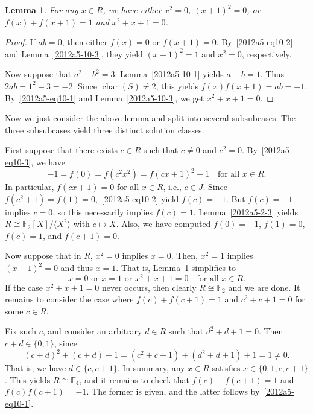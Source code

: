\documentclass{article}
\newcommand{\F}{\mathbb{F}}
\DeclareMathOperator{\rchar}{char}
\newtheorem{lemma}{Lemma}
\begin{document}
\begin{lemma}\label{2012a5-10-4}
For any $x \in R$, we have either $x^2 = 0$, $(x + 1)^2 = 0$, or $f(x) + f(x + 1) = 1$ and $x^2 + x + 1 = 0$.
\end{lemma}
\begin{proof}

If $ab = 0$, then either $f(x) = 0$ or $f(x + 1) = 0$.
By~\eqref{2012a5-eq10-2} and Lemma~\ref{2012a5-10-3}, they yield $(x + 1)^2 = 1$ and $x^2 = 0$, respectively.

Now suppose that $a^2 + b^2 = 3$.
Lemma~\ref{2012a5-10-1} yields $a + b = 1$.
Thus $2ab = 1^2 - 3 = -2$.
Since $\rchar(S) \neq 2$, this yields $f(x) f(x + 1) = ab = -1$.
By~\eqref{2012a5-eq10-1} and Lemma~\ref{2012a5-10-3}, we get $x^2 + x + 1 = 0$.
\end{proof}

Now we just consider the above lemma and split into several subsubcases.
The three subsubcases yield three distinct solution classes.

First suppose that there exists $c \in R$ such that $c \neq 0$ and $c^2 = 0$.
By~\eqref{2012a5-eq10-3}, we have
\[ -1 = f(0) = f(c^2 x^2) = f(cx + 1)^2 - 1 \quad \text{for all } x \in R. \]
In particular, $f(cx + 1) = 0$ for all $x \in R$, i.e., $c \in J$.
Since $f(c^2 + 1) = f(1) = 0$,~\eqref{2012a5-eq10-2} yield $f(c) = -1$.
But $f(c) = -1$ implies $c = 0$, so this necessarily implies $f(c) = 1$.
Lemma~\ref{2012a5-2-3} yields $R \cong \F_2[X]/\langle X^2 \rangle$ with $c \mapsto X$.
Also, we have computed $f(0) = -1$, $f(1) = 0$, $f(c) = 1$, and $f(c + 1) = 0$.

Now suppose that in $R$, $x^2 = 0$ implies $x = 0$.
Then, $x^2 = 1$ implies $(x - 1)^2 = 0$ and thus $x = 1$.
That is, Lemma~\ref{2012a5-10-4} simplifies to
\[ x = 0 \text{ or } x = 1 \text{ or } x^2 + x + 1 = 0 \quad \text{for all } x \in R. \]
If the case $x^2 + x + 1 = 0$ never occurs, then clearly $R \cong \F_2$ and we are done.
It remains to consider the case where $f(c) + f(c + 1) = 1$ and $c^2 + c + 1 = 0$ for some $c \in R$.

Fix such $c$, and consider an arbitrary $d \in R$ such that $d^2 + d + 1 = 0$.
Then $c + d \in \{0, 1\}$, since
\[ (c + d)^2 + (c + d) + 1 = (c^2 + c + 1) + (d^2 + d + 1) + 1 = 1 \neq 0. \]
That is, we have $d \in \{c, c + 1\}$.
In summary, any $x \in R$ satisfies $x \in \{0, 1, c, c + 1\}$.
This yields $R \cong \F_4$, and it remains to check that $f(c) + f(c + 1) = 1$ and $f(c) f(c + 1) = -1$.
The former is given, and the latter follows by~\eqref{2012a5-eq10-1}.
\end{document}
